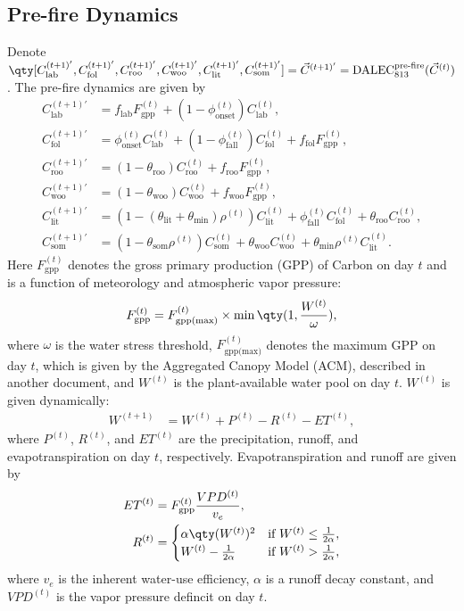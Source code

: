 \documentclass{article}
\begin{document}
		\subsection{Pre-fire Dynamics}
			Denote $\qty[C_\text{lab}^{(t+1)'}, C_\text{fol}^{(t+1)'}, C_\text{roo}^{(t+1)'}, C_\text{woo}^{(t+1)'}, C_\text{lit}^{(t+1)'}, C_\text{som}^{(t+1)'}] = \vec{C}^{(t+1)'} = \text{DALEC}_{813}^\text{pre-fire}(\vec{C}^{(t)})$.  The pre-fire dynamics are given by
			\begin{align}
				C_\text{lab}^{(t+1)'} &= f_\text{lab} F_\text{gpp}^{(t)} + \left(1 - \phi_\text{onset}^{(t)}\right)C_\text{lab}^{(t)}, \\
				C_\text{fol}^{(t+1)'} &= \phi_\text{onset}^{(t)}C_\text{lab}^{(t)} + \left(1 - \phi_\text{fall}^{(t)}\right)C_\text{fol}^{(t)} + f_\text{fol} F_\text{gpp}^{(t)}, \\
				C_\text{roo}^{(t+1)'} &= (1 - \theta_\text{roo})C_\text{roo}^{(t)} + f_\text{roo} F_\text{gpp}^{(t)}, \\
				C_\text{woo}^{(t+1)'} &= (1 - \theta_\text{woo})C_\text{woo}^{(t)} + f_\text{woo} F_\text{gpp}^{(t)}, \\
				C_\text{lit}^{(t+1)'} &= \left(1 - \left(\theta_\text{lit} + \theta_\text{min}\right)\rho^{(t)}\right)C_\text{lit}^{(t)} + \phi_\text{fall}^{(t)}C_\text{fol}^{(t)} + \theta_\text{roo}C_\text{roo}^{(t)}, \\
				C_\text{som}^{(t+1)'} &= \left(1 - \theta_\text{som}\rho^{(t)}\right)C_\text{som}^{(t)} + \theta_\text{woo}C_\text{woo}^{(t)} + \theta_\text{min}\rho^{(t)}C_\text{lit}^{(t)}.
			\end{align}
			Here $F_\text{gpp}^{(t)}$ denotes the gross primary production (GPP) of Carbon on day $t$ and is a function of meteorology and atmospheric vapor pressure:
			\begin{align}
				F_\text{gpp}^{(t)} = F_\text{gpp(max)}^{(t)}\times\min\qty(1, \frac{W^{(t)}}{\omega}),
			\end{align}
			where $\omega$ is the water stress threshold, $F_\text{gpp(max)}^{(t)}$ denotes the maximum GPP on day $t$, which is given by the Aggregated Canopy Model (ACM), described {\color{red}in another document}, and $W^{(t)}$ is the plant-available water pool on day $t$.  $W^{(t)}$ is given dynamically:
			\begin{align}
				W^{(t+1)} &= W^{(t)} + P^{(t)} - R^{(t)} - ET^{(t)},
			\end{align}
			where $P^{(t)}$, $R^{(t)}$, and $ET^{(t)}$ are the precipitation, runoff, and evapotranspiration on day $t$, respectively.  Evapotranspiration and runoff are given by
			\begin{align}
				ET^{(t)} &= F_\text{gpp}^{(t)}\frac{VPD^{(t)}}{v_e},\\
				R^{(t)} &= \begin{cases}
					\alpha \qty(W^{(t)})^2 & \text{if } W^{(t)} \leq \frac{1}{2\alpha},\\
					W^{(t)} - \frac{1}{2\alpha} & \text{if } W^{(t)} > \frac{1}{2\alpha},
					\end{cases}
			\end{align}
			where $v_e$ is the inherent water-use efficiency, $\alpha$ is a runoff decay constant, and $VPD^{(t)}$ is the vapor pressure defincit on day $t$.
\end{document}
